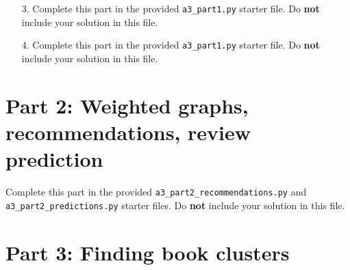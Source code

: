 \documentclass[11pt]{article}
\begin{document}
\begin{enumerate}
\item[3.]
Complete this part in the provided \texttt{a3\_part1.py} starter file.
Do \textbf{not} include your solution in this file.

\item[4.]
Complete this part in the provided \texttt{a3\_part1.py} starter file.
Do \textbf{not} include your solution in this file.

\end{enumerate}

\section*{Part 2: Weighted graphs, recommendations, review prediction}

Complete this part in the provided \texttt{a3\_part2\_recommendations.py} and \texttt{a3\_part2\_predictions.py} starter files.
Do \textbf{not} include your solution in this file.

\newpage

\section*{Part 3: Finding book clusters}
\end{document}
